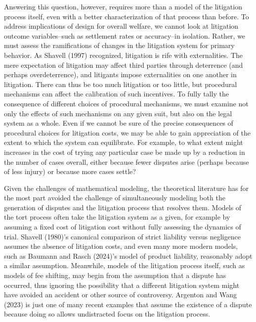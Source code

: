 \documentclass{article}
\begin{document}
Answering this question, however, requires more than a model of the litigation process itself, even with a better characterization of that process than before. To address implications of design for overall welfare, we cannot look at litigation outcome variables--such as settlement rates or accuracy--in isolation. Rather, we must assess the ramifications of changes in the litigation system for primary behavior. As Shavell (1997) recognized, litigation is rife with externalities. The mere expectation of litigation may affect third parties through deterrence (and perhaps overdeterrence), and litigants impose externalities on one another in litigation. There can thus be too much litigation or too little, but procedural mechanisms can affect the calibration of such incentives. To fully tally the consequence of different choices of procedural mechanisms, we must examine not only the effects of such mechanisms on any given suit, but also on the legal system as a whole. Even if we cannot be sure of the precise consequences of procedural choices for litigation costs, we may be able to gain appreciation of the extent to which the system can equilibrate. For example, to what extent might increases in the cost of trying any particular case be made up by a reduction in the number of cases overall, either because fewer disputes arise (perhaps because of less injury) or because more cases settle?

Given the challenges of mathematical modeling, the theoretical literature has for the most part avoided the challenge of simultaneously modeling both the generation of disputes and the litigation process that resolves them. Models of the tort process often take the litigation system as a given, for example by assuming a fixed cost of litigation cost without fully assessing the dynamics of trial. Shavell (1980)'s canonical comparison of strict liability versus negligence assumes the absence of litigation costs, and even many more modern models, such as Baumann and Rasch (2024)'s model of product liability, reasonably adopt a similar assumption. Meanwhile, models of the litigation process itself, such as models of fee shifting, may begin from the assumption that a dispute has occurred, thus ignoring the possibility that a different litigation system might have avoided an accident or other source of controversy. Argenton and Wang (2023) is just one of many recent examples that assume the existence of a dispute because doing so allows undistracted focus on the litigation process.
\end{document}
